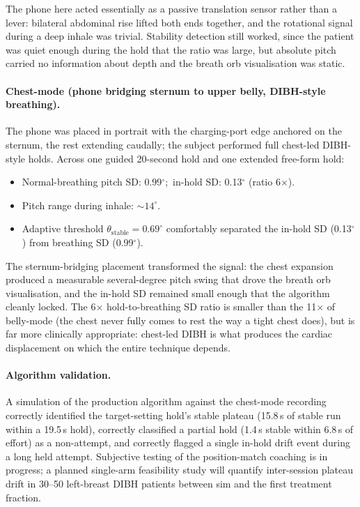 \documentclass[3p,times]{elsarticle}
\begin{document}
The phone here acted essentially as a passive translation sensor
rather than a lever: bilateral abdominal rise lifted both ends
together, and the rotational signal during a deep inhale was
trivial. Stability detection still worked, since the patient was
quiet enough during the hold that the ratio was large, but
absolute pitch carried no information about depth and the breath
orb visualisation was static.

\paragraph{Chest-mode (phone bridging sternum to upper belly,
DIBH-style breathing).} The phone was placed in portrait with the
charging-port edge anchored on the sternum, the rest extending
caudally; the subject performed full chest-led DIBH-style holds.
Across one guided 20-second hold and one extended free-form hold:
\begin{itemize}
  \item Normal-breathing pitch SD: 0.99$^{\circ}$;\, in-hold SD: 0.13$^{\circ}$ (ratio 6$\times$).
  \item Pitch range during inhale: $\sim\!14^{\circ}$.
  \item Adaptive threshold $\theta_{\text{stable}} = 0.69^{\circ}$ comfortably separated the in-hold SD (0.13$^{\circ}$) from breathing SD (0.99$^{\circ}$).
\end{itemize}

The sternum-bridging placement transformed the signal: the chest
expansion produced a measurable several-degree pitch swing that
drove the breath orb visualisation, and the in-hold SD remained
small enough that the algorithm cleanly locked. The 6$\times$
hold-to-breathing SD ratio is smaller than the 11$\times$ of
belly-mode (the chest never fully comes to rest the way a tight
chest does), but is far more clinically appropriate: chest-led
DIBH is what produces the cardiac displacement on which the entire
technique depends.

\paragraph{Algorithm validation.} A simulation of the production
algorithm against the chest-mode recording correctly identified the
target-setting hold's stable plateau (15.8\,s of stable run within
a 19.5\,s hold), correctly classified a partial hold (1.4\,s
stable within 6.8\,s of effort) as a non-attempt, and correctly
flagged a single in-hold drift event during a long held attempt.
Subjective testing of the position-match coaching is in progress;
a planned single-arm feasibility study will quantify
inter-session plateau drift in 30--50 left-breast DIBH patients
between sim and the first treatment fraction.
\end{document}
